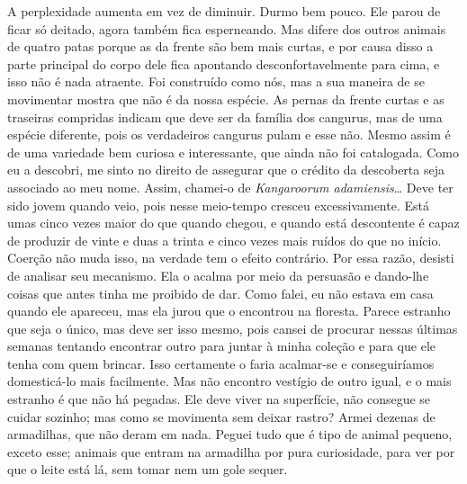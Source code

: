  A perplexidade aumenta em vez de diminuir. Durmo bem
pouco. Ele parou de ficar só deitado, agora também fica esperneando. Mas 
difere dos outros animais de quatro patas porque as da frente são bem mais
curtas, e por causa disso a parte principal do corpo dele fica apontando
desconfortavelmente para cima, e isso não é nada atraente. Foi construído
como nós, mas a sua maneira de se movimentar mostra que não é da nossa espécie.
As pernas da frente curtas e as traseiras compridas indicam que deve ser da família
dos cangurus, mas de uma espécie diferente, pois os verdadeiros cangurus pulam
e esse não. Mesmo assim é de uma variedade bem curiosa e interessante, que ainda
não foi catalogada. Como eu a descobri, me sinto no direito de assegurar que o
crédito da descoberta seja associado ao meu nome. Assim, chamei-o de
\textit{Kangaroorum adamiensis}\ldots{} Deve ter sido jovem quando veio, pois nesse 
meio-tempo cresceu excessivamente. Está umas cinco vezes maior do que quando chegou,
e quando está descontente é capaz de produzir de vinte e duas a trinta e cinco
vezes mais ruídos do que no início. Coerção não muda isso, na verdade tem o efeito
contrário. Por essa razão, desisti de analisar seu mecanismo. Ela o acalma por
meio da persuasão e dando-lhe coisas que antes tinha me proibido de dar. Como
falei, eu não estava em casa quando ele apareceu, mas ela jurou que o encontrou
na floresta. Parece estranho que seja o único, mas deve ser isso mesmo, pois 
cansei de procurar nessas últimas semanas tentando encontrar outro para juntar à
minha coleção e para que ele tenha com quem brincar. Isso certamente o
faria acalmar-se e conseguiríamos domesticá-lo mais facilmente. Mas não encontro
vestígio de outro igual, e o mais estranho é que não há pegadas. Ele
deve viver na superfície, não consegue se cuidar sozinho; mas como
se movimenta sem deixar rastro? Armei dezenas de armadilhas, que não
deram em nada. Peguei tudo que é tipo de animal pequeno, exceto esse; animais
que entram na armadilha por pura curiosidade, para ver por que o leite está lá,
sem tomar nem um gole sequer. 

